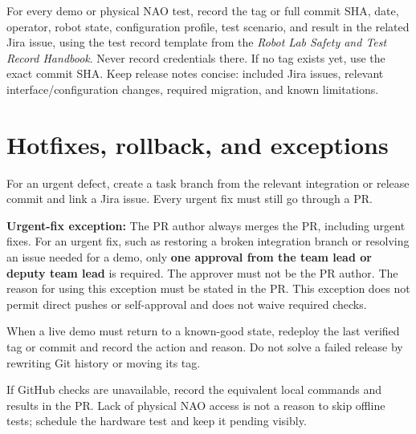 \documentclass[12pt,a4paper]{article}
\newif\ifshowbibliography
\begin{document}
For every demo or physical NAO test, record the tag or full commit SHA, date, operator, robot state, configuration profile, test scenario, and result in the related Jira issue, using the test record template from the \emph{Robot Lab Safety and Test Record Handbook}. Never record credentials there. If no tag exists yet, use the exact commit SHA. Keep release notes concise: included Jira issues, relevant interface/configuration changes, required migration, and known limitations.

\section{Hotfixes, rollback, and exceptions}

For an urgent defect, create a task branch from the relevant integration or release commit and link a Jira issue. Every urgent fix must still go through a PR.

\textbf{Urgent-fix exception:}
The PR author always merges the PR, including urgent fixes.
For an urgent fix, such as restoring a broken integration branch
or resolving an issue needed for a demo, only \textbf{one approval
from the team lead or deputy team lead} is required.
The approver must not be the PR author.
The reason for using this exception must be stated in the PR.
This exception does not permit direct pushes or self-approval
and does not waive required checks.

When a live demo must return to a known-good state, redeploy the last verified tag or commit and record the action and reason. Do not solve a failed release by rewriting Git history or moving its tag.

If GitHub checks are unavailable, record the equivalent local commands and results in the PR. Lack of physical NAO access is not a reason to skip offline tests; schedule the hardware test and keep it pending visibly.
\ifshowbibliography
    \nocite{*}
    \clearpage
    \printbibliography[heading=bibintoc,title={References}]
\fi
\end{document}
